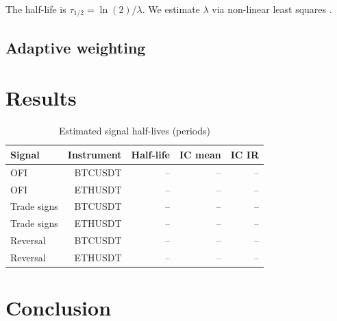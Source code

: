 \documentclass[12pt]{article}
\begin{document}
The half-life is $\tau_{1/2} = \ln(2) / \lambda$. We estimate $\lambda$
via non-linear least squares \citep{scipy2020}.

\subsection{Adaptive weighting}


\section{Results}
\label{sec:results}


\begin{table}[h]
\centering
\caption{Estimated signal half-lives (periods)}
\label{tab:halflife}
\begin{tabular}{lrrrr}
\toprule
Signal & Instrument & Half-life & IC mean & IC IR \\
\midrule
OFI           & BTCUSDT & -- & -- & -- \\
OFI           & ETHUSDT & -- & -- & -- \\
Trade signs   & BTCUSDT & -- & -- & -- \\
Trade signs   & ETHUSDT & -- & -- & -- \\
Reversal      & BTCUSDT & -- & -- & -- \\
Reversal      & ETHUSDT & -- & -- & -- \\
\bottomrule
\end{tabular}
\end{table}

\section{Conclusion}
\label{sec:conclusion}




\end{document}
